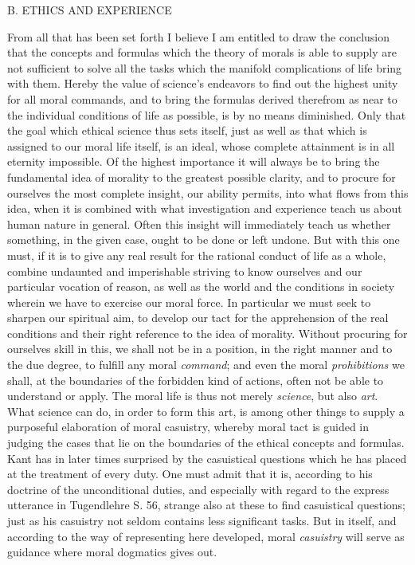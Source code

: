 \documentclass[12pt,a4paper,openany]{book}
\newcommand{\opage}[1]{\marginnote{\footnotesize\textit{[#1]}}}
\newcommand{\excerpthead}[1]{\par\bigskip\begin{center}#1\end{center}\nopagebreak\smallskip}
\begin{document}
\setcounter{footnote}{0}%
\excerpthead{B. ETHICS AND EXPERIENCE}\opage{91}

From all that has been set forth I believe I am entitled to draw the conclusion that
the concepts and formulas which the theory of morals is able to supply are not
sufficient to solve all the tasks which the manifold complications of life bring with
them. Hereby the value of science's endeavors to find out the highest unity for all
moral commands, and to bring the formulas derived therefrom as near to the
individual conditions of life as possible, is by no means diminished. Only that the
goal which ethical science thus sets itself, just as well as that which is assigned
to our moral life itself, is an ideal, whose complete attainment is in all eternity
impossible. Of the highest importance it will always be to bring the fundamental
idea of morality to the greatest possible clarity, and to procure for ourselves the
most complete insight, our ability permits, into what flows from this idea, when it
is combined with what investigation and experience teach us about human nature in
general. Often this insight will immediately teach us whether something, in the given
case, ought to be done or left undone. But with this one must, if it is to give any
real result for the rational conduct of life as a whole, combine undaunted and
imperishable striving to know ourselves and our particular vocation of reason, as
well as the world and the conditions in society wherein we have to exercise our moral
force. In particular we must seek to sharpen our spiritual aim, to develop our tact
for the apprehension of the real conditions and their right reference to the idea of
morality. Without procuring for ourselves skill in this, we shall not be in a
position, in the right manner and to the due degree, to fulfill any moral
\emph{command}; and even the moral \emph{prohibitions} we shall, at the boundaries of
the forbidden kind of actions, often not be able to understand or apply. The moral
life is thus not merely \emph{science}, but also \emph{art}. What science
\setcounter{footnote}{0}%
\opage{92}can do, in order to form this art, is among other things to supply a purposeful
elaboration of moral casuistry, whereby moral tact is guided in judging the cases
that lie on the boundaries of the ethical concepts and formulas. Kant has in later
times surprised by the casuistical questions which he has placed at the treatment of
every duty. One must admit that it is, according to his doctrine of the
unconditional duties, and especially with regard to the express utterance in
Tugendlehre S. 56, strange also at these to find casuistical questions; just as his
casuistry not seldom contains less significant tasks. But in itself, and according to
the way of representing here developed, moral \emph{casuistry} will serve as guidance
where moral dogmatics gives out.
\end{document}
